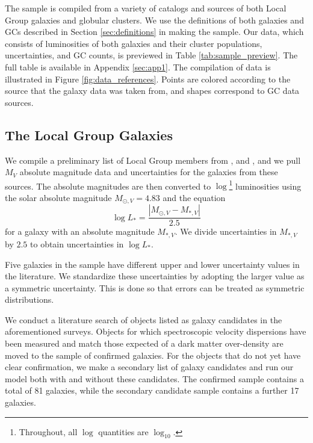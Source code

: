 \documentclass[twocolumn]{aastex631}
\begin{document}
The sample is compiled from a variety of catalogs and sources of both Local Group galaxies and globular clusters. We use the definitions of both galaxies and GCs described in Section \ref{sec:definitions} in making the sample. Our data, which consists of luminosities of both galaxies and their cluster populations, uncertainties, and GC counts, is previewed in Table \ref{tab:sample_preview}. The full table is available in Appendix \ref{sec:app1}. The compilation of data is illustrated in Figure \ref{fig:data_references}. Points are colored according to the source that the galaxy data was taken from, and shapes correspond to GC data sources. 

\subsection{The Local Group Galaxies} \label{subsec:sample_galaxies}

We compile a preliminary list of Local Group members from \citet{Simon2019}, \citet{DrlicaWagner2020} and \citet{McConnachie2012}, and we pull $M_V$ absolute magnitude data and uncertainties for the galaxies from these sources. The absolute magnitudes are then converted to $\log$\footnote{Throughout, all $\log$ quantities are $\log_{10}.$} luminosities using the solar absolute magnitude $M_{\odot,V}=4.83$ and the equation
\begin{equation}
    \log{L_*} = \frac{|M_{\odot,V}-M_{*,V}|}{2.5}
\end{equation}
for a galaxy with an absolute magnitude $M_{*,V}$. We divide uncertainties in $M_{*,V}$ by $2.5$ to obtain uncertainties in $\log{L_*}$. 

Five galaxies in the sample have different upper and lower uncertainty values in the literature. We standardize these uncertainties by adopting the larger value as a symmetric uncertainty. This is done so that errors can be treated as symmetric distributions.

We conduct a literature search of objects listed as galaxy candidates in the aforementioned surveys. Objects for which spectroscopic velocity dispersions have been measured and match those expected of a dark matter over-density are moved to the sample of confirmed galaxies. For the objects that do not yet have clear confirmation, we make a secondary list of galaxy candidates and run our model both with and without these candidates. The confirmed sample contains a total of 81 galaxies, while the secondary candidate sample contains a further 17 galaxies. 
\end{document}
